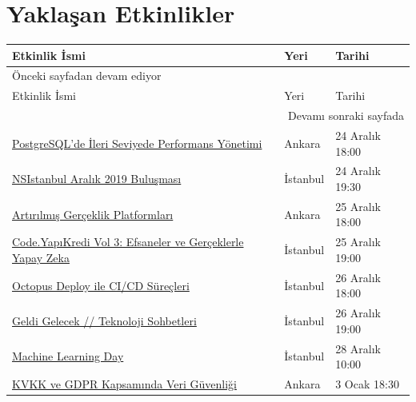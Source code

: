 \documentclass[11pt]{article}
\begin{document}
\section{Yaklaşan Etkinlikler}
\label{sec:org4e42179}
\begin{longtable}{|p{8cm}|l|l|}
\hline
Etkinlik İsmi & Yeri & Tarihi\\
\hline
\endfirsthead
\multicolumn{3}{l}{Önceki sayfadan devam ediyor} \\
\hline

Etkinlik İsmi & Yeri & Tarihi \\

\hline
\endhead
\hline\multicolumn{3}{r}{Devamı sonraki sayfada} \\
\endfoot
\endlastfoot
\hline
\href{https://kommunity.com/bilge-adam-teknoloji/events/postgresqlde-ileri-seviyede-performans-yonetimi}{PostgreSQL'de İleri Seviyede Performans Yönetimi} & Ankara & 24 Aralık 18:00\\
\href{https://kommunity.com/nsistanbul/events/nsistanbul-aralik-2019-bulusmasi}{NSIstanbul Aralık 2019 Buluşması} & İstanbul & 24 Aralık 19:30\\
\href{https://www.eventbrite.com/e/artrlms-gerceklik-platformlar-tickets-86102672411}{Artırılmış Gerçeklik Platformları} & Ankara & 25 Aralık 18:00\\
\href{https://www.eventbrite.com/e/codeyapkredi-vol-3-efsaneler-ve-gerceklerle-yapay-zeka-tickets-86411628507}{Code.YapıKredi Vol 3: Efsaneler ve Gerçeklerle Yapay Zeka} & İstanbul & 25 Aralık 19:00\\
\href{https://kommunity.com/sovos-foriba-rd/events/octopus-deploy-ile-cicd-surecleri}{Octopus Deploy ile CI/CD Süreçleri} & İstanbul & 26 Aralık 18:00\\
\href{https://kommunity.com/kodluyoruz/events/geldi-gelecek-teknoloji-sohbetleri-sertac-doganay-aykut-ibrisim}{Geldi Gelecek // Teknoloji Sohbetleri} & İstanbul & 26 Aralık 19:00\\
\href{https://kommunity.com/devnot-yazilimci-bulusmalari/events/machine-learning-day}{Machine Learning Day} & İstanbul & 28 Aralık 10:00\\
\href{https://www.meetup.com/tr-TR/Hukuk-ve-Teknoliji-Meetup-Grubu/events/267223619/}{KVKK ve GDPR Kapsamında Veri Güvenliği} & Ankara & 3 Ocak 18:30\\
\hline
\end{longtable}
\end{document}
